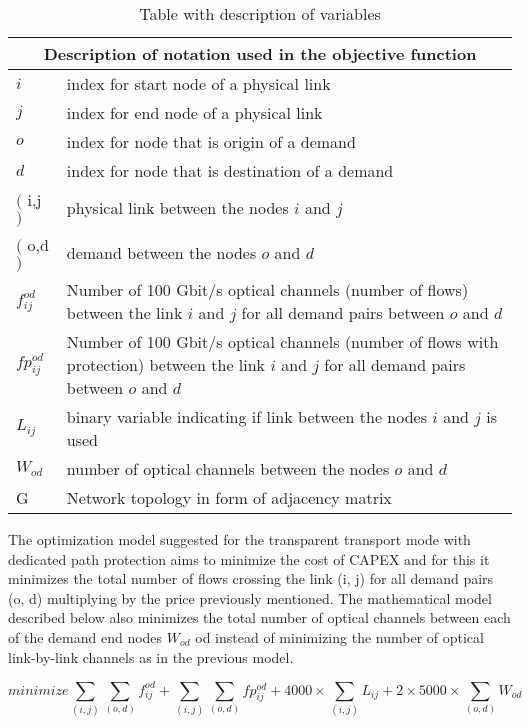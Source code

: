 \begin{table}[h!]
\centering
\begin{tabular}{ |p{1cm}||p{13cm}|}
 \hline
 \multicolumn{2}{|c|}{Description of notation used in the objective function} \\
 \hline
 \hline
 $i$ & index for start node of a physical link \\
 $j$ & index for end node of a physical link \\
 $o$ & index for node that is origin of a demand \\
 $d$ & index for node that is destination of a demand \\
 $($ i,j $)$ & physical link between the nodes $i$ and $j$ \\
 $($ o,d $)$ & demand between the nodes $o$ and $d$ \\
 $f_{ij}^{od}$ & Number of 100 Gbit/s optical channels (number of flows) between the link $i$ and $j$ for all demand pairs between $o$ and $d$ \\
 $fp_{ij}^{od}$ & Number of 100 Gbit/s optical channels (number of flows with protection) between the link $i$ and $j$ for all demand pairs between $o$ and $d$ \\
 $L_{ij}$ & binary variable indicating if link between the nodes $i$ and $j$ is used \\
 $W_{od}$ & number of optical channels between the nodes $o$ and $d$\\
 G & Network topology in form of adjacency matrix \\
 \hline
\end{tabular}
\caption{Table with description of variables}
\label{description_transp}
\end{table}

The optimization model suggested for the transparent transport mode with dedicated path protection aims to minimize the cost of CAPEX and for this it minimizes the total number of flows crossing the link (i, j) for all demand pairs (o, d) multiplying by the price previously mentioned. The mathematical model described below also minimizes the total number of optical channels between each of the demand end nodes $W_{od}$ od instead of minimizing the number of optical link-by-link channels as in the previous model.
\vspace{10pt}

\begin{equation}
minimize    \sum_{(i,j)} \sum_{(o,d)} f_{ij}^{od} + \sum_{(i,j)} \sum_{(o,d)} fp_{ij}^{od} + 4000 \times \sum_{(i,j)} L_{ij} + 2 \times 5000 \times \sum_{(o,d)} W_{od}
\label{ILPTransp}
\end{equation}

